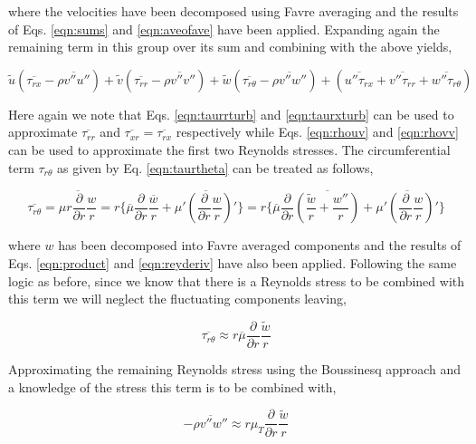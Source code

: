 	where the velocities have been decomposed using Favre averaging and the results of Eqs. \ref{eqn:sums} and
\ref{eqn:aveofave} have been applied.  Expanding again the remaining term in this group over its sum and combining with
the above yields,

\begin{displaymath}
	\tilde u (\overline{\tau_{rx}} - \overline{\rho v'' u''}) + \tilde v (\overline{\tau_{rr}} 
	- \overline{\rho v'' v''}) + \tilde w(\overline{\tau_{r\theta}} - \overline{\rho v'' w''})
	+ (\overline{u''\tau_{rx}} + \overline{v''\tau_{rr}} + \overline{w''\tau_{r\theta}})
\end{displaymath}

	Here again we note that Eqs. \ref{eqn:taurrturb} and \ref{eqn:taurxturb} can be used
to approximate $\overline{\tau_{rr}}$ and $\overline{\tau_{xr}} = \overline{\tau_{rx}}$ respectively while
Eqs. \ref{eqn:rhouv} and \ref{eqn:rhovv} can be used to approximate the first two Reynolds stresses.
The circumferential term $\tau_{r\theta}$ as given by Eq. \ref{eqn:taurtheta} can be treated as follows,

\begin{displaymath}
	\overline{\tau_{r\theta}} = \overline{\mu r\frac{\partial}{\partial r}\frac{w}{r}} = r\Big\{
	\overline \mu \frac{\partial}{\partial r}\frac{\overline{w}}{r} + 
	\overline{\mu'(\frac{\partial}{\partial r}\frac{w}{r})'} \Big\} = r\Big\{
	\overline \mu \frac{\partial}{\partial r}\overline{(\frac{\tilde w}{r} + \frac{w''}{r})} + 
	\overline{\mu'(\frac{\partial}{\partial r}\frac{w}{r})'} \Big\}
\end{displaymath}

	where $w$ has been decomposed into Favre averaged components and the results of 
Eqs. \ref{eqn:product} and \ref{eqn:reyderiv} have also been applied.  Following the same
logic as before, since we know that there is a Reynolds stress to be combined with this term we will neglect the 
fluctuating components leaving,

\begin{equation}
	\overline{\tau_{r\theta}} \approx r
	\overline \mu \frac{\partial}{\partial r}\frac{\tilde w}{r}
\label{eqn:taurthetaturb}
\end{equation}  

	Approximating the remaining Reynolds stress using the Boussinesq approach and a knowledge of the stress
this term is to be combined with,

\begin{equation}
	-\overline{\rho v'' w''} \approx r \mu_T \frac{\partial}{\partial r}\frac{\tilde w}{r}
\label{eqn:rhovw}
\end{equation}

